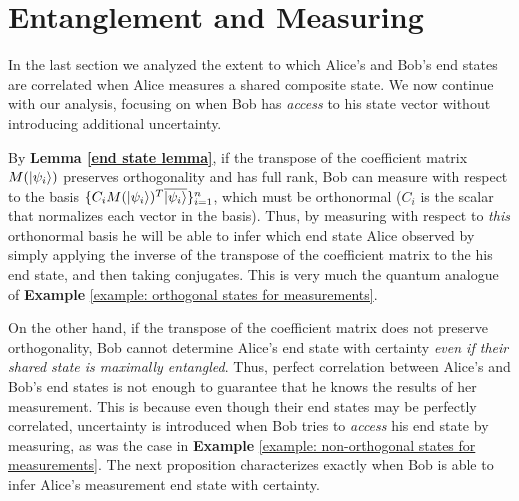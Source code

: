 \pagebreak

\section{Entanglement and Measuring}
\label{Section 6.2}
In the last section we analyzed the extent to which Alice's and Bob's end states are correlated when Alice measures a shared composite state. We now continue with our analysis, focusing on when Bob has {\emph{access}} to his state vector without introducing additional uncertainty. 

By \textbf{Lemma \ref{end state lemma}}, if the transpose of the coefficient matrix $M(\ket{\psi_i})$ preserves orthogonality and has full rank, Bob can measure with respect to the basis $\{C_i M(\ket{\psi_i})^T \overline{\ket{\psi_i}}\}_{i=1}^n$, which must be orthonormal ($C_i$ is the scalar that normalizes each vector in the basis). Thus, by measuring with respect to {\emph{this}} orthonormal basis he will be able to infer which end state Alice observed by simply applying the inverse of the transpose of the coefficient matrix to the his end state, and then taking conjugates. This is very much the quantum analogue of {\bf{Example}} \ref{example: orthogonal states for measurements}.

On the other hand, if the transpose of the coefficient matrix does not preserve orthogonality, Bob cannot determine Alice's end state with certainty {\emph{even if their shared state is maximally entangled}}.  Thus, perfect correlation between Alice's and Bob's end states is not enough to guarantee that he knows the results of her measurement.  This is because even though their end states may be perfectly correlated, uncertainty is introduced when Bob tries to {\emph{access}} his end state by measuring, as was the case in {\bf{Example}} \ref{example: non-orthogonal states for measurements}.  The next proposition characterizes exactly when Bob is able to infer Alice's measurement end state with certainty.  

